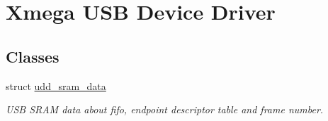 \hypertarget{group__udd__xmega__usb__group}{\section{Xmega U\-S\-B Device Driver}
\label{group__udd__xmega__usb__group}
}
\subsection*{Classes}
\begin{DoxyCompactItemize}
\item 
struct \hyperlink{structudd__sram__data}{udd\-\_\-sram\-\_\-data}
\begin{DoxyCompactList}\small\item\em U\-S\-B S\-R\-A\-M data about fifo, endpoint descriptor table and frame number. \end{DoxyCompactList}\end{DoxyCompactItemize}
